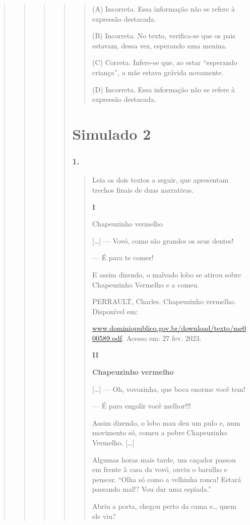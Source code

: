 \begin{quote}
\begin{quote}
\begin{quote}
\begin{quote}
\begin{quote}
(A) Incorreta. Essa informação não se refere à expressão destacada.

(B) Incorreta. No texto, verifica-se que os pais estavam, dessa vez,
esperando uma menina.

(C) Correta. Infere-se que, ao estar ``esperando criança'', a mãe estava
grávida novamente.

(D) Incorreta. Essa informação não se refere à expressão destacada.
\end{quote}

\section{Simulado 2}\label{simulado-2}

\subsubsection{1. }\label{section-84}

\begin{quote}
Leia os dois textos a seguir, que apresentam trechos finais de duas
narrativas.

\textbf{I}

Chapeuzinho vermelho

{[}\ldots{}{]} --- Vovó, como são grandes os seus dentes!

--- É para te comer!

E assim dizendo, o malvado lobo se atirou sobre Chapeuzinho Vermelho e a
comeu.

PERRAULT, Charles. Chapeuzinho vermelho. Disponível em:

\href{http://www.dominiopublico.gov.br/download/texto/me000589.pdf}{www.dominiopublico.gov.br/download/texto/me000589.pdf}.
Acesso em: 27 fev. 2023.

\textbf{II}

\textbf{Chapeuzinho vermelho}

{[}\ldots{}{]} --- Oh, vovozinha, que boca enorme você tem!

--- É para engolir você melhor!!!

Assim dizendo, o lobo mau deu um pulo e, num movimento só, comeu a pobre
Chapeuzinho Vermelho. {[}\ldots{}{]}

Algumas horas mais tarde, um caçador passou em frente à casa da vovó,
ouviu o barulho e pensou: ``Olha só como a velhinha ronca! Estará
passando mal!? Vou dar uma espiada.''

Abriu a porta, chegou perto da cama e\ldots{} quem ele viu?


\end{quote}
\end{quote}
\end{quote}
\end{quote}
\end{quote}
